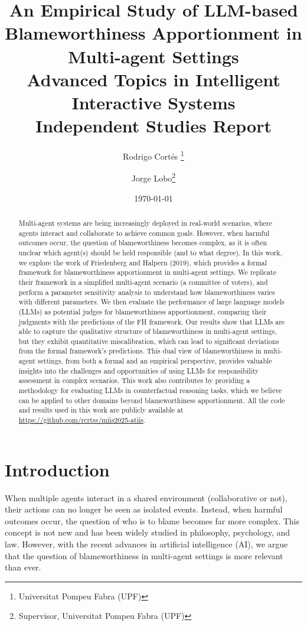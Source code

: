 \documentclass{article}
\title{\huge An Empirical Study of LLM-based Blameworthiness Apportionment in Multi-agent Settings\\
  \vspace{0.5cm}
  \large Advanced Topics in Intelligent Interactive Systems \\
  \large Independent Studies Report}
\author{Rodrigo Cort\'es \thanks{Universitat Pompeu Fabra (UPF)} \and Jorge Lobo\thanks{Supervisor, Universitat Pompeu Fabra (UPF)}}
\date{\today}
\begin{document}
\maketitle

\begin{abstract}
Multi-agent systems are being increasingly deployed in real-world scenarios, where agents interact and collaborate to achieve common goals. However, when harmful outcomes occur, the question of blameworthiness becomes complex, as it is often unclear which agent(s) should be held responsible (and to what degree). In this work, we explore the work of Friedenberg and Halpern (2019), which provides a formal framework for blameworthiness apportionment in multi-agent settings. We replicate their framework in a simplified multi-agent scenario (a committee of voters), and perform a parameter sensitivity analysis to understand how blameworthiness varies with different parameters. We then evaluate the performance of large language models (LLMs) as potential judges for blameworthiness apportionment, comparing their judgments with the predictions of the FH framework. Our results show that LLMs are able to capture the qualitative structure of blameworthiness in multi-agent settings, but they exhibit quantitative miscalibration, which can lead to significant deviations from the formal framework's predictions. This dual view of blameworthiness in multi-agent settings, from both a formal and an empirical perspective, provides valuable insights into the challenges and opportunities of using LLMs for responsibility assessment in complex scenarios. This work also contributes by providing a methodology for evaluating LLMs in counterfactual reasoning tasks, which we believe can be applied to other domains beyond blameworthiness apportionment. All the code and results used in this work are publicly available at \url{https://github.com/rcrtss/miis2025-atiis}.
\end{abstract}

\newpage
\tableofcontents
\newpage


\section{Introduction}

When multiple agents interact in a shared environment (collaborative or not), their actions can no longer be seen as isolated events. Instead, when harmful outcomes occur, the question of who is to blame becomes far more complex. This concept is not new and has been widely studied in philosophy, psychology, and law. However, with the recent advances in artificial intelligence (AI), we argue that the question of blameworthiness in multi-agent settings is more relevant than ever. 
\end{document}
